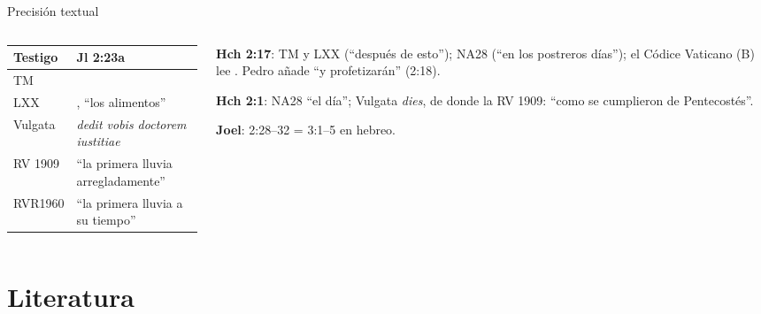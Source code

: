 \begin{frame}{Precisión textual}
\begin{columns}[t,onlytextwidth]
\begin{column}{0.53\textwidth}
\scriptsize\renewcommand{\arraystretch}{1.12}
\begin{tabular}{@{}L{1.3cm}L{4.9cm}@{}}
\toprule
\textbf{Testigo} & \textbf{Jl 2:23a} \\ \midrule
TM &  \\
LXX & , ``los alimentos'' \\
Vulgata & \emph{dedit vobis doctorem iustitiae} \\
RV 1909 & ``la primera lluvia arregladamente'' \\
RVR1960 & ``la primera lluvia a su tiempo'' \\
\bottomrule
\end{tabular}
\end{column}
\begin{column}{0.45\textwidth}\scriptsize\RaggedRight
\textbf{Hch 2:17}: TM  y LXX  (``después de esto''); NA28  (``en los postreros días''); el Códice Vaticano (B) lee . Pedro añade ``y profetizarán'' (2:18).\par\smallskip
\textbf{Hch 2:1}: NA28 ``el día''; Vulgata \emph{dies}, de donde la RV 1909: ``como se cumplieron  de Pentecostés''.\par\smallskip
\textbf{Joel}: 2:28--32 = 3:1--5 en hebreo.
\end{column}
\end{columns}
\end{frame}

\section{Literatura}

